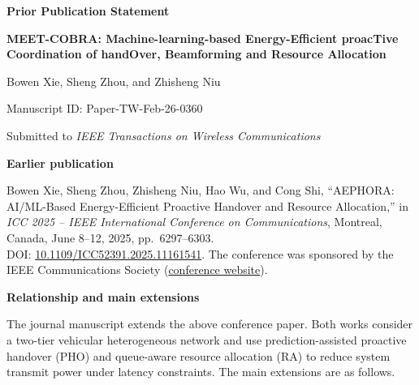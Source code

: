 \documentclass[11pt,a4paper]{article}
\begin{document}
\begin{center}
  {\Large\bfseries Prior Publication Statement}\par
  \vspace{0.4em}
  {\bfseries MEET-COBRA: Machine-learning-based Energy-Efficient proacTive
  Coordination of handOver, Beamforming and Resource Allocation}\par
  Bowen Xie, Sheng Zhou, and Zhisheng Niu\par
  Manuscript ID: Paper-TW-Feb-26-0360\par
  Submitted to \emph{IEEE Transactions on Wireless Communications}
\end{center}

\textbf{Earlier publication}

Bowen Xie, Sheng Zhou, Zhisheng Niu, Hao Wu, and Cong Shi,
``AEPHORA: AI/ML-Based Energy-Efficient Proactive Handover and Resource Allocation,''
in \emph{ICC 2025 -- IEEE International Conference on Communications},
Montreal, Canada, June 8--12, 2025, pp.~6297--6303.\\
DOI: \href{https://doi.org/10.1109/ICC52391.2025.11161541}{10.1109/ICC52391.2025.11161541}.
The conference was sponsored by the IEEE Communications Society
(\href{https://icc2025.ieee-icc.org/}{conference website}).

\textbf{Relationship and main extensions}

The journal manuscript extends the above conference paper. Both works consider
a two-tier vehicular heterogeneous network and use prediction-assisted proactive
handover (PHO) and queue-aware resource allocation (RA) to reduce system transmit
power under latency constraints. The main extensions are as follows.
\end{document}
